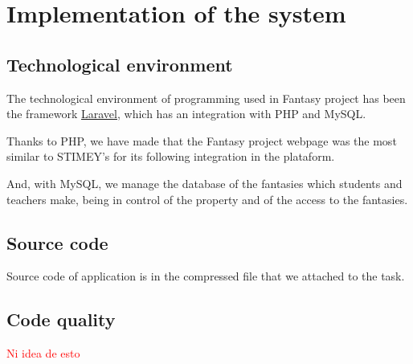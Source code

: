 \chapter{Implementation of the system}
\section{Technological environment}
The technological environment of programming used in Fantasy project has been the framework \href{https://laravel.com/}{Laravel}, which has an integration with PHP and MySQL.

Thanks to PHP, we have made that the Fantasy project webpage was the most similar to STIMEY's for its following integration in the plataform.

And, with MySQL, we manage the database of the fantasies which students and teachers make, being in control of the property and of the access to the fantasies.

\section{Source code}
Source code of application is in the compressed file that we attached to the task.


\section{Code quality}
\textcolor{red}{Ni idea de esto}